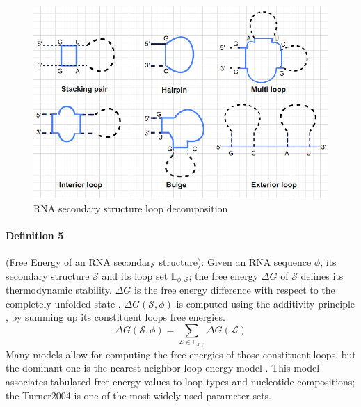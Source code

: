 \begin{figure}[H]
	\includegraphics[width=1.0 \linewidth]{../res/images/loops2.png}
	\caption{RNA secondary structure loop decomposition}\label{fig:loops}
\end{figure}

\paragraph{\textbf{Definition 5}} (Free Energy of an RNA secondary structure): Given an RNA sequence $\phi$, its secondary structure $\mathcal{S}$ and its loop set $\mathbb{L}_{\phi, \mathcal{S}}$; the free energy \(\Delta G\) of $\mathcal{S}$ defines its thermodynamic stability. \(\Delta G\) is the free energy difference with respect to the completely unfolded state \cite{tinoco_estimation_1971}. \(\Delta G (\mathcal{S}, \phi)\) is computed using the additivity principle \cite{dill97_addit_princ_bioch}, by summing up its constituent loops free energies.
\begin{equation}
	 \Delta G(\mathcal{S}, \phi) = \sum_{\mathcal{L}\in \mathbb{L}_{\mathcal{S}, \phi}}{ \Delta G(\mathcal{L}) }
\end{equation}
Many models allow for computing the free energies of those constituent loops, but the dominant one is the nearest-neighbor loop energy model \cite{turner09_nndb}. This model associates tabulated free energy values to loop types and nucleotide compositions; the Turner2004 \cite{mathews2004incorporating} is one of the most widely used parameter sets. 

